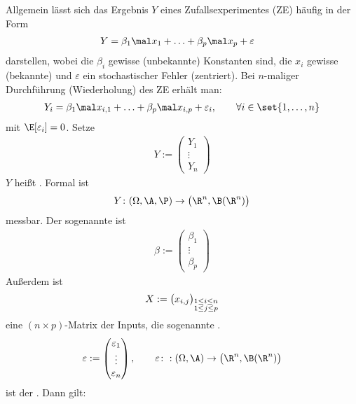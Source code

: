 Allgemein lässt sich das Ergebnis $Y$ eines Zufallsexperimentes (ZE) häufig in der Form
\begin{align*}
	Y&=\beta_1\mal x_1+\ldots+\beta_p\mal x_p+\varepsilon
\end{align*}
darstellen, wobei die $\beta_i$ gewisse (unbekannte) Konstanten sind, die $x_i$ gewisse (bekannte)  und $\varepsilon$ ein stochastischer Fehler (zentriert).
Bei $n$-maliger Durchführung (Wiederholung) des ZE erhält man:
\begin{align}\label{eq:1.1}
	Y_i=\beta_1\mal x_{i,1}+\ldots+\beta_p\mal x_{i,p}+\varepsilon_i,\qquad\forall i\in\set{1,\ldots,n}
\end{align}
mit $\E[\varepsilon_i]=0$.
Setze
\begin{align*}
	Y:=
	\begin{pmatrix}
		Y_1\\
		\vdots\\
		Y_n
	\end{pmatrix}
\end{align*}
$Y$ heißt .
Formal ist
\begin{align*}
	Y\colon(\Omega,\A,\P)\to\big(\R^n,\B(\R^n)\big)
\end{align*}
messbar.
Der sogenannte  ist
\begin{align*}
	\beta:=\begin{pmatrix}
		\beta_1\\
		\vdots\\
		\beta_p
	\end{pmatrix}
\end{align*}
Außerdem ist
\begin{align*}
	X:=\big(x_{i,j}\big)_{\begin{subarray}{c}
		1\leq i\leq n\\
		1\leq j\leq p
	\end{subarray}}
\end{align*}
eine $(n\times p)$-Matrix der Inputs, die sogenannte .
\begin{align*}
	\varepsilon:=\begin{pmatrix}
		\varepsilon_1\\
		\vdots\\
		\varepsilon_n
	\end{pmatrix},\qquad
	\varepsilon\colon:(\Omega,\A)\to\big(\R^n,\B(\R^n)\big)
\end{align*}
ist der .
Dann gilt: %
